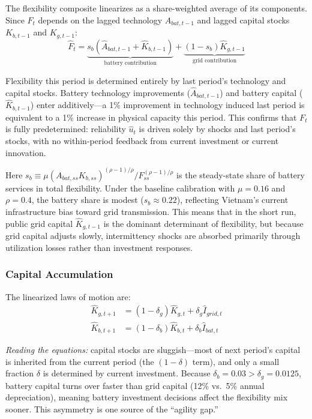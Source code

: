 \documentclass[12pt, a4paper]{article}
\begin{document}
The flexibility composite linearizes as a share-weighted average of its components. Since $F_t$ depends on the lagged technology $A_{bat,t-1}$ and lagged capital stocks $K_{b,t-1}$ and $K_{g,t-1}$:
\begin{equation}
\hat{F}_t = \underbrace{s_b \left(\hat{A}_{bat,t-1} + \hat{K}_{b,t-1}\right)}_{\text{battery contribution}} + \underbrace{(1 - s_b) \hat{K}_{g,t-1}}_{\text{grid contribution}}
\label{eq:flex_lin}
\end{equation}

Flexibility this period is determined entirely by last period's technology and capital stocks. Battery technology improvements ($\hat{A}_{bat,t-1}$) and battery capital ($\hat{K}_{b,t-1}$) enter additively---a 1\% improvement in technology induced last period is equivalent to a 1\% increase in physical capacity this period. This confirms that $F_t$ is fully predetermined: reliability $\hat{u}_t$ is driven solely by shocks and last period's stocks, with no within-period feedback from current investment or current innovation.

Here $s_b \equiv \mu (A_{bat,ss} K_{b,ss})^{(\rho-1)/\rho} / F_{ss}^{(\rho-1)/\rho}$ is the steady-state share of battery services in total flexibility. Under the baseline calibration with $\mu = 0.16$ and $\rho = 0.4$, the battery share is modest ($s_b \approx 0.22$), reflecting Vietnam's current infrastructure bias toward grid transmission. This means that in the short run, public grid capital $\hat{K}_{g,t-1}$ is the dominant determinant of flexibility, but because grid capital adjusts slowly, intermittency shocks are absorbed primarily through utilization losses rather than investment responses.

\subsubsection{Capital Accumulation}

The linearized laws of motion are:
\begin{align}
\hat{K}_{g,t+1} &= (1-\delta_g)\hat{K}_{g,t} + \delta_g \hat{I}_{grid,t} \label{eq:kg_lin} \\
\hat{K}_{b,t+1} &= (1-\delta_b)\hat{K}_{b,t} + \delta_b \hat{I}_{bat,t} \label{eq:kb_lin}
\end{align}

\noindent \textit{Reading the equations:} capital stocks are sluggish---most of next period's capital is inherited from the current period (the $(1-\delta)$ term), and only a small fraction $\delta$ is determined by current investment. Because $\delta_b = 0.03 > \delta_g = 0.0125$, battery capital turns over faster than grid capital (12\% vs.\ 5\% annual depreciation), meaning battery investment decisions affect the flexibility mix sooner. This asymmetry is one source of the ``agility gap.''
\end{document}
